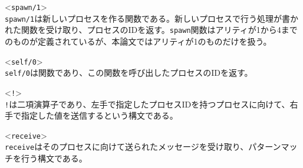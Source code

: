 \begin{description}
\item<\lstinline{spawn/1}>\mbox{}\\
  \lstinline{spawn/1}は新しいプロセスを作る関数である。新しいプロセスで行う処理が書かれた関数を受け取り、プロセスのIDを返す。\lstinline{spawn}関数はアリティが1から4までのものが定義されているが、本論文ではアリティが1のものだけを扱う。
\item<\lstinline{self/0}>\mbox{}\\
  \lstinline{self/0}は関数であり、この関数を呼び出したプロセスのIDを返す。
\item<\lstinline{!}>\mbox{}\\
  \lstinline{!}は二項演算子であり、左手で指定したプロセスIDを持つプロセスに向けて、右手で指定した値を送信するという構文である。
\item<\lstinline{receive}>\mbox{}\\
  \lstinline{receive}はそのプロセスに向けて送られたメッセージを受け取り、パターンマッチを行う構文である。
\end{description}
